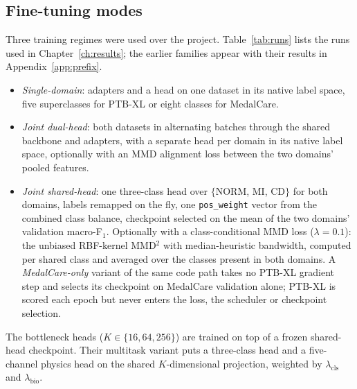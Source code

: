 \subsection{Fine-tuning modes}
Three training regimes were used over the project. Table~\ref{tab:runs} lists the runs used in Chapter~\ref{ch:results}; the earlier families appear with their results in Appendix~\ref{app:prefix}.
\begin{itemize}[nosep]
\item \emph{Single-domain}: adapters and a head on one dataset in its native label space, five superclasses for PTB-XL or eight classes for MedalCare.
\item \emph{Joint dual-head}: both datasets in alternating batches through the shared backbone and adapters, with a separate head per domain in its native label space, optionally with an MMD alignment loss between the two domains' pooled features. 
\item \emph{Joint shared-head}: one three-class head over $\{$NORM, MI, CD$\}$ for both domains, labels remapped on the fly, one \texttt{pos\_weight} vector from the combined class balance, checkpoint selected on the mean of the two domains' validation macro-F$_1$. Optionally with a class-conditional MMD loss ($\lambda=0.1$): the unbiased RBF-kernel MMD$^2$ with median-heuristic bandwidth, computed per shared class and averaged over the classes present in both domains. A \emph{MedalCare-only} variant of the same code path takes no PTB-XL gradient step and selects its checkpoint on MedalCare validation alone; PTB-XL is scored each epoch but never enters the loss, the scheduler or checkpoint selection. 
\end{itemize}
The bottleneck heads ($K\in\{16,64,256\}$) are trained on top of a frozen shared-head checkpoint. Their multitask variant puts a three-class head and a five-channel physics head on the shared $K$-dimensional projection, weighted by $\lambda_{\mathrm{cls}}$ and $\lambda_{\mathrm{bio}}$. 

